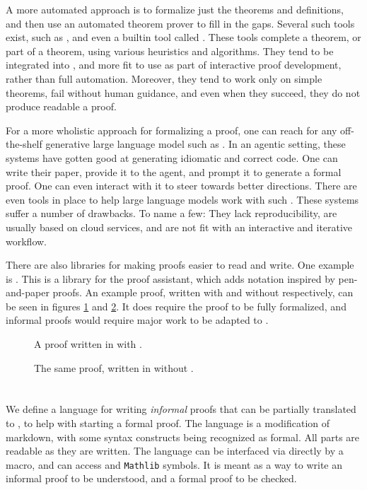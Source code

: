 \documentclass{article}
\makeatletter
\newcommand{\code}{\texttt}
\newcommand{\mathlib}{\code{Mathlib}\xspace}
\let\oldsection\section
\renewcommand{\section}{\@ifstar\customsectionstar\customsectionnostar}
\newcommand{\customsectionstar}[1]{\oldsection*{\large#1}\vspace{-0.5em}}
\newcommand{\customsectionnostar}[1]{\oldsection*{\large#1}\vspace{-0.5em}}
\makeatother
\begin{document}
A more automated approach is to formalize just the theorems and definitions, and
then use an automated theorem prover to fill in the gaps. Several such tools
exist, such as \aesop \cite{limperg_2022_7430233}, \leanegg
\cite{10.1145/3776667}
and even a builtin tool called \grind.
These tools complete a theorem, or part of a theorem, using various heuristics
and algorithms.
They tend to be integrated into \lean, and more fit to use as part of
interactive proof development, rather than full automation.
Moreover, they tend to work only on simple theorems, fail without human guidance,
and even when they succeed, they do not produce readable a proof.

For a more wholistic approach for formalizing a proof, one can reach for any
off-the-shelf generative large language model such as \chatgpt.
In an agentic setting, these systems have gotten good at generating idiomatic
and correct \lean code.
One can write their paper, provide it to the agent, and prompt it to generate a
formal \lean proof.
One can even interact with it to steer towards better directions.
There are even tools in place to help large language models work with \lean such
\aristotle \cite{achim2025aristotleimolevelautomatedtheorem}.
These systems suffer a number of drawbacks. To name a few:
They lack reproducibility,
are usually based on cloud services,
and are not fit with an interactive and iterative workflow.

There are also libraries for making proofs easier to read and write. One example
is \waterproof. This is a library for the \rocq proof assistant, which adds
notation inspired by pen-and-paper proofs.
An example proof, written with and without \waterproof respectively, can be seen
in figures \ref{fig:waterproof} and \ref{fig:no-waterproof}.
It does require the proof to be
fully formalized, and informal proofs would require major work to be adapted to
\waterproof.

\begin{figure}

\caption{A proof written in \rocq with \waterproof.}
\label{fig:waterproof}
\end{figure}

\begin{figure}

\caption{The same proof, written in \rocq without \waterproof.}
\label{fig:no-waterproof}
\end{figure}

\section{Our Approach}
We define a language for writing \emph{informal} proofs that can be partially
translated to \lean, to help with starting a formal proof.
The language is a modification of markdown, with some syntax constructs being
recognized as formal. All parts are readable as they are written.
The language can be interfaced via \lean directly by a macro,
and can access \lean and \mathlib symbols.
It is meant as a way to write an informal proof to be understood, and a formal
proof to be checked.
\end{document}
